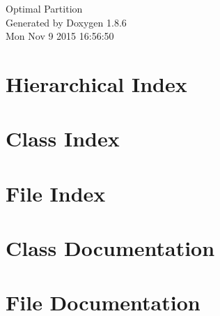 \documentclass[twoside]{book}
\newcommand{\clearemptydoublepage}{%
  \newpage{\pagestyle{empty}\cleardoublepage}%
}
\begin{document}
\hypersetup{pageanchor=false}
\begin{titlepage}
\vspace*{7cm}
\begin{center}%
{\Large Optimal Partition }\\
\vspace*{1cm}
{\large Generated by Doxygen 1.8.6}\\
\vspace*{0.5cm}
{\small Mon Nov 9 2015 16:56:50}\\
\end{center}
\end{titlepage}
\clearemptydoublepage
\tableofcontents
\clearemptydoublepage
{}
\hypersetup{pageanchor=true}

\chapter{Hierarchical Index}

\chapter{Class Index}

\chapter{File Index}

\chapter{Class Documentation}














































\chapter{File Documentation}





\newpage
{}
{}
\printindex
\end{document}
